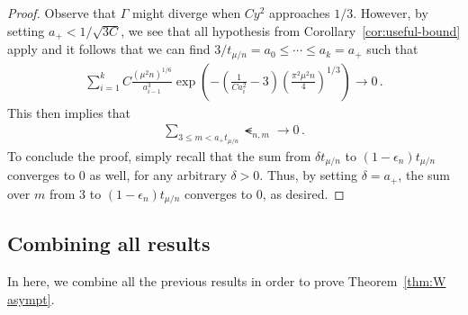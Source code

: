 \documentclass{article}
\newcommand{\1}{\mathbbm{1}}								%
\theoremstyle{definition}
\numberwithin{equation}{section}
\begin{document}
\begin{proof}
    Observe that $\Gamma$ might diverge when $Cy^2$ approaches $1/3$.
    However, by setting $a_+<1/\sqrt{3C}$, we see that all hypothesis from Corollary~\ref{cor:useful-bound} apply and it follows that we can find $3/t_{\mu/n}=a_0\leq\cdots\leq a_k=a_+$ such that
    \begin{align*}
        \sum_{i=1}^kC\frac{(\mu^2n)^{1/6}}{a_{i-1}^3}\exp\left(-\left(\frac{1}{Ca_i^2}-3\right)\left(\frac{\pi^2\mu^2n}{4}\right)^{1/3}\right)\longrightarrow0\,.
    \end{align*}
    This then implies that
    \begin{align*}
        \sum_{3\leq m<a_+t_{\mu/n}}\smt_{n,m}\longrightarrow0\,.
    \end{align*}
    To conclude the proof, simply recall that the sum from $\delta t_{\mu/n}$ to $(1-\epsilon_n)t_{\mu/n}$ converges to $0$ as well, for any arbitrary $\delta>0$.
    Thus, by setting $\delta=a_+$, the sum over $m$ from $3$ to $(1-\epsilon_n)t_{\mu/n}$ converges to $0$, as desired.
\end{proof}

\subsection{Combining all results}\label{sec:W asymptotic}

In here, we combine all the previous results in order to prove Theorem~\ref{thm:W asympt}.
\end{document}
